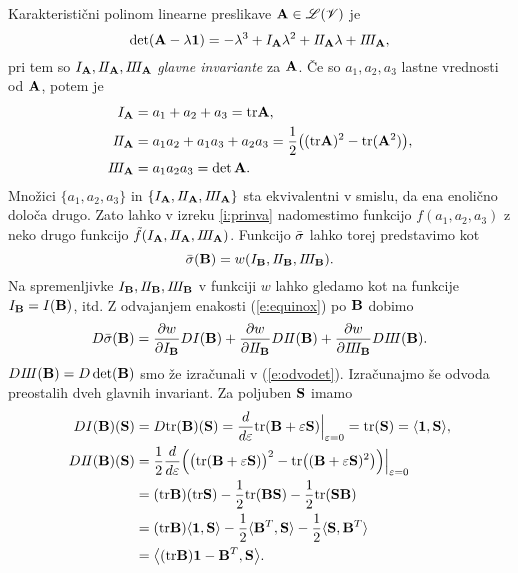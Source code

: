 Karakteristični polinom linearne preslikave $\mathbf A\in\mathscr L(\mathscr V)$ je
\[
	\det(\mathbf A-\lambda\mathbf 1)=-\lambda^3+I_{\mathbf A}\lambda^2+I\! I_{\mathbf A}\lambda+I\! I\! I_{\mathbf A},
\]
pri tem so $I_{\mathbf A}, I\! I_{\mathbf A}, I\! I\! I_{\mathbf A}$ \emph{glavne invariante} za $\mathbf A$.
Če so $a_1,a_2,a_3$ lastne vrednosti od $\mathbf A$, potem je
\begin{align*}
	I_{\mathbf A}&=a_1+a_2+a_3=\mathrm{tr}\mathbf A,\\
	I\! I_{\mathbf A}&=a_1a_2+a_1a_3+a_2a_3=\frac{1}{2}\big((\mathrm{tr}\mathbf A)^2-\mathrm{tr}(\mathbf A^2)\big),\\
	I\! I\! I_{\mathbf A}&=a_1a_2a_3=\det\mathbf A.
\end{align*}
Množici $\{a_1,a_2,a_3\}$ in $\{I_{\mathbf A},I\! I_{\mathbf A},I\! I\! I_{\mathbf A}\}$ sta ekvivalentni
v smislu, da ena enoli\-čno določa drugo. Zato lahko v izreku \ref{i:prinva} nadomestimo
funkcijo $f(a_1,a_2,a_3)$ z neko drugo funkcijo $\tilde{f}(I_{\mathbf A},I\! I_{\mathbf A},I\! I\! I_{\mathbf A})$.
Funkcijo $\bar{\sigma}$ lahko torej predstavimo kot
\begin{equation} \label{e:equinox}
	\bar{\sigma}(\mathbf B)=w(I_{\mathbf B},I\! I_{\mathbf B},I\! I\! I_{\mathbf B}).
\end{equation}
Na spremenljivke $I_{\mathbf B},I\! I_{\mathbf B},I\! I\! I_{\mathbf B}$ v funkciji $w$ lahko gledamo kot
na funkcije $I_{\mathbf B}=I(\mathbf B)$, itd. Z odvajanjem enakosti (\ref{e:equinox}) po $\mathbf B$ dobimo
\begin{equation} \label{e:dbshy}
	D\bar{\sigma}(\mathbf B)=\frac{\partial w}{\partial I_{\mathbf B}}DI(\mathbf B)+
	\frac{\partial w}{\partial I\! I_{\mathbf B}}DI\! I(\mathbf B)+
	\frac{\partial w}{\partial I\! I\! I_{\mathbf B}}DI\! I\! I(\mathbf B).
\end{equation}
$DI\! I\! I(\mathbf B)=D\det(\mathbf B)$ smo že izračunali v (\ref{e:odvodet}). Izračunajmo še
odvoda preostalih dveh glavnih invariant. Za poljuben $\mathbf S$ imamo
\begin{align*}
	DI(\mathbf B)(\mathbf S)&=D\mathrm{tr}(\mathbf B)(\mathbf S)=
	\frac{d}{d\varepsilon}\mathrm{tr}(\mathbf B+\varepsilon\mathbf S)\Big|_{\varepsilon=0}=
	\mathrm{tr}(\mathbf S)=\langle\mathbf 1,\mathbf S\rangle,\\
	DI\! I(\mathbf B)(\mathbf S)&=
	\frac{1}{2}\frac{d}{d\varepsilon}\Big(
	\big(\mathrm{tr}(\mathbf B+\varepsilon\mathbf S)\big)^2-\mathrm{tr}\big((\mathbf B+\varepsilon\mathbf S)^2\big)
	\Big)\Big|_{\varepsilon=0}\\
	&=(\mathrm{tr}\mathbf B)(\mathrm{tr}\mathbf S)-\frac{1}{2}\mathrm{tr}(\mathbf B\mathbf S)-\frac{1}{2}\mathrm{tr}(\mathbf S\mathbf B)\\
	&=(\mathrm{tr}\mathbf B)\langle\mathbf 1,\mathbf S\rangle-\frac{1}{2}\langle\mathbf B^T,\mathbf S\rangle
	-\frac{1}{2}\langle\mathbf S,\mathbf B^T\rangle\\
	&=\big<(\mathrm{tr}\mathbf B)\mathbf 1-\mathbf B^T,\mathbf S\big>.
\end{align*}
